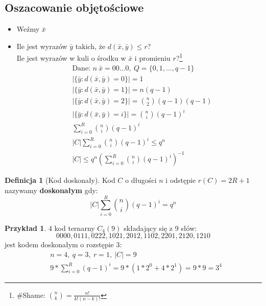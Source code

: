 \documentclass[a4paper,12pt]{article}
\theoremstyle{definition}%
\newtheorem{example}{Przykład}
\newtheorem*{example*}{Przykład} %
\theoremstyle{definition}
\newtheorem{definition}{Definicja}%
\theoremstyle{problem}
\begin{document}
\subsection{Oszacowanie objętościowe}
\begin{itemize}
\item Weźmy $\bar{x}$
\item Ile jest wyrazów $\bar{y}$ takich, że $d(\bar{x},\bar{y})\leq r$?\\
Ile jest wyrazów w kuli o środku w $\bar{x}$ i promieniu $r$?\footnote{\#Shame: $\binom{n}{k}=\frac{n!}{k!(n-k)!}$}
\begin{align*}
&\text{Dane: }n\ \bar{x}=00\dots 0,\ Q=\{0,1,\dots ,q-1\}\\
&|\{\bar{y}:d(\bar{x},\bar{y})=0\}|=1\\
&|\{\bar{y}:d(\bar{x},\bar{y})=1\}|=n(q-1)\\
&|\{\bar{y}:d(\bar{x},\bar{y})=2\}|=\binom{n}{2}(q-1)(q-1)\\
&|\{\bar{y}:d(\bar{x},\bar{y})=i\}|=\binom{n}{i}(q-1)^i\\
&\sum _{i=0}^R\binom{n}{i}(q-1)^i\\
&|C|\sum _{i=0}^R\binom{n}{i}(q-1)^i\leq q^n\\
&|C|\leq  q^n\left(\sum _{i=0}^R\binom{n}{i}(q-1)^i\right)^{-1}
\end{align*}
\end{itemize}
\begin{definition}[Kod doskonały]
Kod $C$ o długości $n$ i odstępie $r(C)=2R+1$ nazywamy \textbf{doskonałym} gdy: $$|C|\sum _{i=0}^R\binom{n}{i}(q-1)^i= q^n$$
\end{definition}
\begin{example*}
4 kod ternarny $C_4(9)$ składający się z 9 słów: $$0000,0111,0222,1021,2012,1102,2201,2120,1210$$ jest kodem doskonałym o rozstępie 3:
\begin{align*}
&n=4,\ q=3,\ r=1,\ |C|=9\\
&9*\sum_{i=0}^R(q-1)^i=9*\left(1*2^0+4*2^1\right)=9*9=3^4
\end{align*}
\end{example*}
\end{document}
